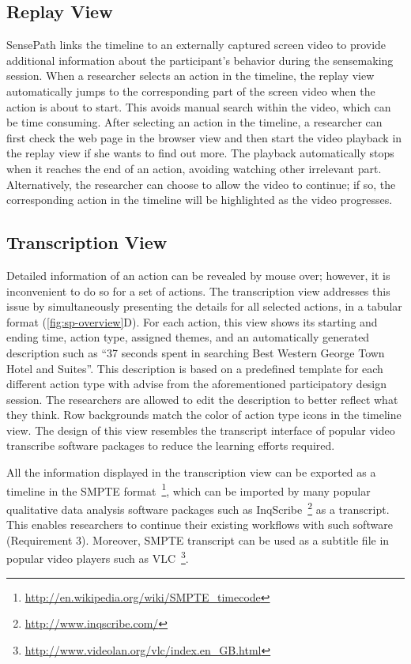 \subsection{Replay View}
\label{sub:playback}
SensePath links the timeline to an externally captured screen video to provide additional information about the participant's behavior during the sensemaking session. When a researcher selects an action in the timeline, the replay view automatically jumps to the corresponding part of the screen video when the action is about to start. This avoids manual search within the video, which can be time consuming. After selecting an action in the timeline, a researcher can first check the web page in the browser view and then start the video playback in the replay view if she wants to find out more. The playback automatically stops when it reaches the end of an action, avoiding watching other irrelevant part. Alternatively, the researcher can choose to allow the video to continue; if so, the corresponding action in the timeline will be highlighted as the video progresses.

\subsection{Transcription View}
Detailed information of an action can be revealed by mouse over; however, it is inconvenient to do so for a set of actions. The transcription view addresses this issue by simultaneously presenting the details for all selected actions, in a tabular format (\autoref{fig:sp-overview}D). For each action, this view shows its starting and ending time, action type, assigned themes, and an automatically generated description such as ``37 seconds spent in searching Best Western George Town Hotel and Suites''. This description is based on a predefined template for each different action type with advise from the aforementioned participatory design session. The researchers are allowed to edit the description to better reflect what they think. Row backgrounds match the color of action type icons in the timeline view. The design of this view resembles the transcript interface of popular video transcribe software packages to reduce the learning efforts required.

All the information displayed in the transcription view can be exported as a timeline in the SMPTE format~\footnote{ \url{http://en.wikipedia.org/wiki/SMPTE_timecode}}, which can be imported by many popular qualitative data analysis software packages such as InqScribe~\footnote{\url{http://www.inqscribe.com/}} as a transcript. This enables researchers to continue their existing workflows with such software (Requirement 3). Moreover, SMPTE transcript can be used as a subtitle file in popular video players such as VLC~\footnote{\url{http://www.videolan.org/vlc/index.en_GB.html}}.

